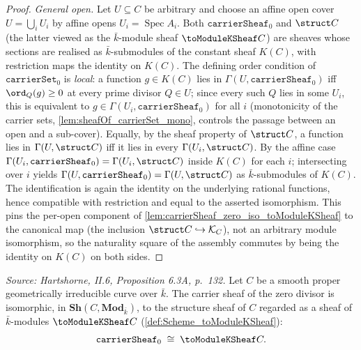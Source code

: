 \begin{proof}
  \emph{General open.} Let \(U \subseteq C\) be arbitrary and choose an affine
  open cover \(U = \bigcup_i U_i\) by affine opens \(U_i = \operatorname{Spec}
  A_i\). Both \(\texttt{carrierSheaf}_0\) and \(\struct C\) (the latter viewed
  as the \(\bar k\)-module sheaf \(\toModuleKSheaf C\)) are sheaves whose
  sections are realised as \(\bar k\)-submodules of the constant sheaf
  \(K(C)\), with restriction maps the identity on \(K(C)\). The defining order
  condition of \(\texttt{carrierSet}_0\) is \emph{local}: a function
  \(g \in K(C)\) lies in \(\Gamma(U, \texttt{carrierSheaf}_0)\) iff
  \(\ord_Q(g) \ge 0\) at every prime divisor \(Q \in U\); since every such
  \(Q\) lies in some \(U_i\), this is equivalent to \(g \in \Gamma(U_i,
  \texttt{carrierSheaf}_0)\) for all \(i\) (monotonicity of the carrier sets,
  \cref{lem:sheafOf_carrierSet_mono}, controls the passage between an open and
  a sub-cover). Equally, by the sheaf property of \(\struct C\), a function
  lies in \(\Gamma(U, \struct C)\) iff it lies in every \(\Gamma(U_i,
  \struct C)\). By the affine case \(\Gamma(U_i, \texttt{carrierSheaf}_0) =
  \Gamma(U_i, \struct C)\) inside \(K(C)\) for each \(i\); intersecting over
  \(i\) yields \(\Gamma(U, \texttt{carrierSheaf}_0) = \Gamma(U, \struct C)\) as
  \(\bar k\)-submodules of \(K(C)\). The identification is again the identity on
  the underlying rational functions, hence compatible with restriction and equal
  to the asserted isomorphism. This pins the per-open component of
  \cref{lem:carrierSheaf_zero_iso_toModuleKSheaf} to the canonical map (the
  inclusion \(\struct C \hookrightarrow \mathcal K_C\)), not an arbitrary module
  isomorphism, so the naturality square of the assembly commutes by being the
  identity on \(K(C)\) on both sides.
\end{proof}

\begin{lemma}
  \label{lem:carrierSheaf_zero_iso_toModuleKSheaf}
  \textit{Source: Hartshorne, II.6, Proposition 6.3A, p.~132.}
  Let \(C\) be a smooth proper geometrically irreducible curve over \(\bar k\).
  The carrier sheaf of the zero divisor is isomorphic, in
  \(\mathbf{Sh}(C, \mathbf{Mod}_{\bar k})\), to the structure sheaf of \(C\)
  regarded as a sheaf of \(\bar k\)-modules \(\toModuleKSheaf C\)
  (\cref{def:Scheme_toModuleKSheaf}):
  \[
    \texttt{carrierSheaf}_0 \;\cong\; \toModuleKSheaf C.
  \]
\end{lemma}


